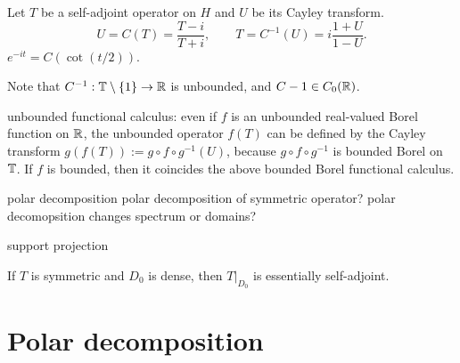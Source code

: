 \documentclass{../../large}
\begin{document}
\begin{prb}
Let $T$ be a self-adjoint operator on $H$ and $U$ be its Cayley transform.
\[U=C(T)=\frac{T-i}{T+i},\qquad T=C^{-1}(U)=i\frac{1+U}{1-U}.\]
$e^{-it}=C(\cot(t/2))$.
\begin{parts}
\item Note that $C^{-1}:\mathbb{T}\setminus\{1\}\to\mathbb{R}$ is unbounded, and $C-1\in C_0(\mathbb{R})$.
\item unbounded functional calculus: even if $f$ is an unbounded real-valued Borel function on $\mathbb{R}$, the unbounded operator $f(T)$ can be defined by the Cayley transform $g(f(T)):=g\circ f\circ g^{-1}(U)$, because $g\circ f\circ g^{-1}$ is bounded Borel on $\mathbb{T}$.
If $f$ is bounded, then it coincides the above bounded Borel functional calculus.
\end{parts}
\end{prb}


\begin{prb}
polar decomposition
polar decomposition of symmetric operator?
polar decomopsition changes spectrum or domains?

support projection
\end{prb}

\begin{prb}
\end{prb}

\begin{prb}
\begin{parts}
\item If $T$ is symmetric and $D_0$ is dense, then $T|_{D_0}$ is essentially self-adjoint.
\end{parts}
\end{prb}

\begin{prb}
\end{prb}


\section{Polar decomposition}
\end{document}
